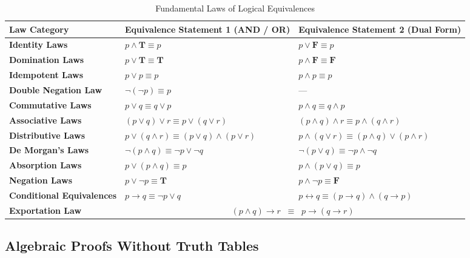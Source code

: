 \documentclass[11pt,a4paper]{article}
\begin{document}
\begin{table}[htbp]
\centering
\small
\begin{tabularx}{\textwidth}{|l|X|X|}
\hline
\rowcolor{primaryblue} \color{white}\textbf{Law Category} & \color{white}\textbf{Equivalence Statement 1 (AND / OR)} & \color{white}\textbf{Equivalence Statement 2 (Dual Form)} \\ \hline
\textbf{Identity Laws} & $p \land \mathbf{T} \equiv p$ & $p \lor \mathbf{F} \equiv p$ \\ \hline
\textbf{Domination Laws} & $p \lor \mathbf{T} \equiv \mathbf{T}$ & $p \land \mathbf{F} \equiv \mathbf{F}$ \\ \hline
\textbf{Idempotent Laws} & $p \lor p \equiv p$ & $p \land p \equiv p$ \\ \hline
\textbf{Double Negation Law} & $\neg(\neg p) \equiv p$ & --- \\ \hline
\textbf{Commutative Laws} & $p \lor q \equiv q \lor p$ & $p \land q \equiv q \land p$ \\ \hline
\textbf{Associative Laws} & $(p \lor q) \lor r \equiv p \lor (q \lor r)$ & $(p \land q) \land r \equiv p \land (q \land r)$ \\ \hline
\textbf{Distributive Laws} & $p \lor (q \land r) \equiv (p \lor q) \land (p \lor r)$ & $p \land (q \lor r) \equiv (p \land q) \lor (p \land r)$ \\ \hline
\textbf{De Morgan's Laws} & \textbf{$\neg(p \land q) \equiv \neg p \lor \neg q$} & \textbf{$\neg(p \lor q) \equiv \neg p \land \neg q$} \\ \hline
\textbf{Absorption Laws} & $p \lor (p \land q) \equiv p$ & $p \land (p \lor q) \equiv p$ \\ \hline
\textbf{Negation Laws} & $p \lor \neg p \equiv \mathbf{T}$ & $p \land \neg p \equiv \mathbf{F}$ \\ \hline
\textbf{Conditional Equivalences} & \textbf{$p \rightarrow q \equiv \neg p \lor q$} & \textbf{$p \leftrightarrow q \equiv (p \rightarrow q) \land (q \rightarrow p)$} \\ \hline
\textbf{Exportation Law} & \multicolumn{2}{c|}{$(p \land q) \rightarrow r \;\;\equiv\;\; p \rightarrow (q \rightarrow r)$} \\ \hline
\end{tabularx}
\caption{Fundamental Laws of Logical Equivalences}
\end{table}

\subsection{Algebraic Proofs Without Truth Tables}
\end{document}
